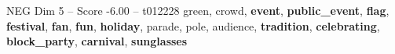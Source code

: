 \begin{textsample}{NEG Dim 5 – Score -6.00 – t012228}  \label{ex:f5_neg_024}
green, crowd, \textbf{event}, \textbf{public\_event}, \textbf{flag}, \textbf{festival}, \textbf{fan}, \textbf{fun}, \textbf{holiday}, parade, pole, audience, \textbf{tradition}, \textbf{celebrating}, \textbf{block\_party}, \textbf{carnival}, \textbf{sunglasses}

\end{textsample}

